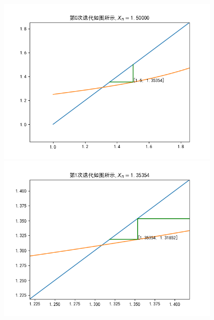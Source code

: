 \documentclass[UTF8]{ctexart}
\begin{document}
\begin{figure}[h]
  \centering
  \begin{minipage}[t]{0.4\linewidth}
  \includegraphics[width=\linewidth]{第0次迭代.png}
  \end{minipage}%
  \begin{minipage}[t]{0.4\linewidth}
  \includegraphics[width=\linewidth]{第1次迭代.png}
  \end{minipage}
\end{figure}
\end{document}
